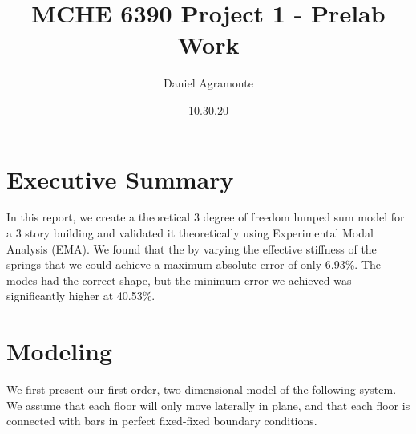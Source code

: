 \documentclass{article}
\title{\Huge MCHE 6390 Project 1 - Prelab Work} \author{Daniel Agramonte} \date{10.30.20}
\begin{document}
\maketitle
\section*{Executive Summary}
In this report, we create a theoretical 3 degree of freedom lumped sum model for a 3 story building and validated it theoretically using Experimental Modal Analysis (EMA). We found that the by varying the effective stiffness of the springs that we could achieve a maximum absolute error of only 6.93\%. The modes had the correct shape, but the minimum error we achieved was significantly higher at 40.53\%.   
\section*{Modeling}
We first present our first order, two dimensional model of the following system. We assume that each floor will only move laterally in plane, and that each floor is connected with bars in perfect fixed-fixed boundary conditions.
\end{document}
